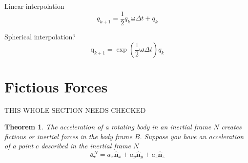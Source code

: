 \documentclass{amsart}
\newtheorem{theorem}{Theorem}[section]
\theoremstyle{definition}
\theoremstyle{remark}
\numberwithin{equation}{section}
\begin{document}
Linear interpolation
\begin{equation}
  q_{k+1} = \frac{1}{2}q_k\boldsymbol\omega\Delta t + q_k 
\end{equation}

Spherical interpolation?
\begin{equation}
  \mathrm{q}_{k+1} = \exp\left(\frac{1}{2} \boldsymbol\omega\Delta t\right)q_k
\end{equation}

\section{Fictious Forces}
THIS WHOLE SECTION NEEDS CHECKED
\begin{theorem}
The acceleration of a rotating body in an inertial frame $N$ creates fictious or inertial forces in the body frame $B$.
Suppose you have an acceleration of a point $c$  described in the inertial frame $N$
\begin{equation}
  \mathbf{a}^N_c = a_x\mathbf{\hat{n}}_x + a_y \mathbf{\hat{n}}_y + a_z \mathbf{\hat{n}}_z
\end{equation}
\end{theorem}
\end{document}
